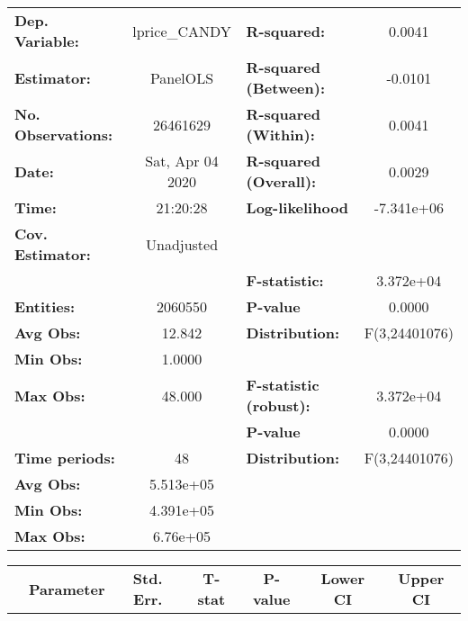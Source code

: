 \documentclass{report}
\begin{document}
\begin{center}
\begin{tabular}{lclc}
\toprule
\textbf{Dep. Variable:}    &   lprice\_CANDY    & \textbf{  R-squared:         }   &      0.0041      \\
\textbf{Estimator:}        &      PanelOLS      & \textbf{  R-squared (Between):}  &     -0.0101      \\
\textbf{No. Observations:} &      26461629      & \textbf{  R-squared (Within):}   &      0.0041      \\
\textbf{Date:}             &  Sat, Apr 04 2020  & \textbf{  R-squared (Overall):}  &      0.0029      \\
\textbf{Time:}             &      21:20:28      & \textbf{  Log-likelihood     }   &    -7.341e+06    \\
\textbf{Cov. Estimator:}   &     Unadjusted     & \textbf{                     }   &                  \\
\textbf{}                  &                    & \textbf{  F-statistic:       }   &    3.372e+04     \\
\textbf{Entities:}         &      2060550       & \textbf{  P-value            }   &      0.0000      \\
\textbf{Avg Obs:}          &       12.842       & \textbf{  Distribution:      }   &  F(3,24401076)   \\
\textbf{Min Obs:}          &       1.0000       & \textbf{                     }   &                  \\
\textbf{Max Obs:}          &       48.000       & \textbf{  F-statistic (robust):} &    3.372e+04     \\
\textbf{}                  &                    & \textbf{  P-value            }   &      0.0000      \\
\textbf{Time periods:}     &         48         & \textbf{  Distribution:      }   &  F(3,24401076)   \\
\textbf{Avg Obs:}          &     5.513e+05      & \textbf{                     }   &                  \\
\textbf{Min Obs:}          &     4.391e+05      & \textbf{                     }   &                  \\
\textbf{Max Obs:}          &      6.76e+05      & \textbf{                     }   &                  \\
\bottomrule
\end{tabular}
\begin{tabular}{lcccccc}
                           & \textbf{Parameter} & \textbf{Std. Err.} & \textbf{T-stat} & \textbf{P-value} & \textbf{Lower CI} & \textbf{Upper CI}  \\

\end{tabular}
\end{center}
\end{document}
